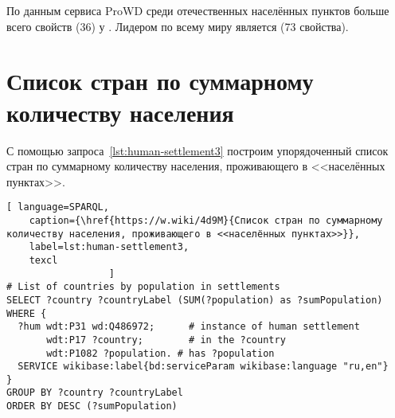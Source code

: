 По данным сервиса ProWD 
среди отечественных населённых пунктов 
больше всего свойств (36) у . 
Лидером по всему миру является  (73 свойства)\autocite{humansettlements_ProWD}.


\section{Список стран по суммарному количеству населения}

\begin{marginfigure}[1.0cm]
{
\setlength{\fboxsep}{0pt}%
\setlength{\fboxrule}{1pt}%
%
}
  \caption{Это герб населённого пункта России или другой страны?\newline%
См. ответ~\protect\ref{answer:flag_human_settlements} на с.~\protect\pageref{answer:flag_human_settlements}.}
  \label{fig:flag_question_human_settlements2}%
\end{marginfigure}

С помощью запроса~\ref{lst:human-settlement3} 
построим упорядоченный список стран по суммарному количеству населения, проживающего в <<населённых пунктах>>.

\lstset{numbers=left, firstnumber=1, frame=single}
\begin{lstlisting}[ language=SPARQL, 
    caption={\href{https://w.wiki/4d9M}{Список стран по суммарному количеству населения, проживающего в <<населённых пунктах>>}},
    label=lst:human-settlement3,
    texcl 
                  ]
# List of countries by population in settlements
SELECT ?country ?countryLabel (SUM(?population) as ?sumPopulation)
WHERE {
  ?hum wdt:P31 wd:Q486972;  	# instance of human settlement
       wdt:P17 ?country;    	# in the ?country
       wdt:P1082 ?population. # has ?population
  SERVICE wikibase:label{bd:serviceParam wikibase:language "ru,en"}
}
GROUP BY ?country ?countryLabel 
ORDER BY DESC (?sumPopulation)
\end{lstlisting}%

